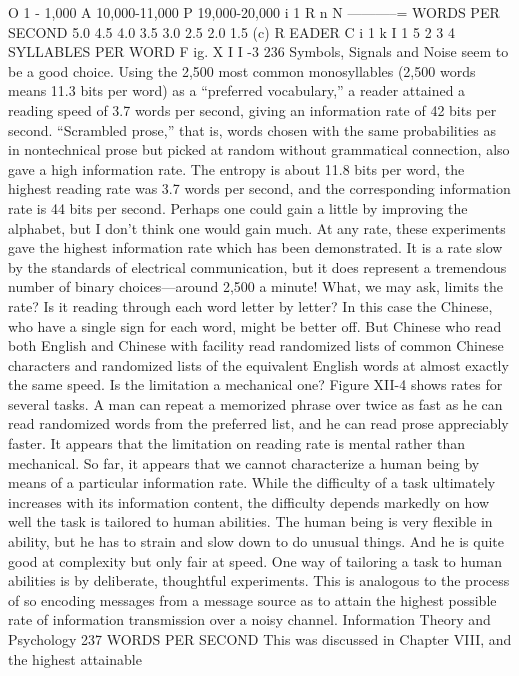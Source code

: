 {{{{{{{{{{{O 1 - 1,000
A 10,000-11,000
P 19,000-20,000
i
1 R n
N
-----------=
WORDS PER SECOND
5.0
4.5
4.0
3.5
3.0
2.5
2.0
1.5
(c) R EADER C
i
1
k
I
1 5
2 3 4
SYLLABLES PER WORD
F ig. X I I -3
236
Symbols, Signals and Noise
seem to be a good choice. Using the 2,500 most common monosyllables
(2,500 words means 11.3 bits per word) as a “preferred
vocabulary,” a reader attained a reading speed of 3.7 words per
second, giving an information rate of 42 bits per second.
“Scrambled prose,” that is, words chosen with the same probabilities
as in nontechnical prose but picked at random without
grammatical connection, also gave a high information rate. The
entropy is about 11.8 bits per word, the highest reading rate was
3.7 words per second, and the corresponding information rate is
44 bits per second.
Perhaps one could gain a little by improving the alphabet, but
I don’t think one would gain much. At any rate, these experiments
gave the highest information rate which has been demonstrated.
It is a rate slow by the standards of electrical communication, but
it does represent a tremendous number of binary choices—around
2,500 a minute!
What, we may ask, limits the rate? Is it reading through each
word letter by letter? In this case the Chinese, who have a single
sign for each word, might be better off. But Chinese who read both
English and Chinese with facility read randomized lists of common
Chinese characters and randomized lists of the equivalent English
words at almost exactly the same speed.
Is the limitation a mechanical one? Figure XII-4 shows rates for
several tasks. A man can repeat a memorized phrase over twice
as fast as he can read randomized words from the preferred list,
and he can read prose appreciably faster. It appears that the
limitation on reading rate is mental rather than mechanical.
So far, it appears that we cannot characterize a human being
by means of a particular information rate. While the difficulty of
a task ultimately increases with its information content, the difficulty
depends markedly on how well the task is tailored to human
abilities. The human being is very flexible in ability, but he has to
strain and slow down to do unusual things. And he is quite good
at complexity but only fair at speed.
One way of tailoring a task to human abilities is by deliberate,
thoughtful experiments. This is analogous to the process of so
encoding messages from a message source as to attain the highest
possible rate of information transmission over a noisy channel.
Information Theory and Psychology 237
WORDS PER SECOND
This was discussed in Chapter VIII, and the highest attainable
}}}}}}}}}}}
